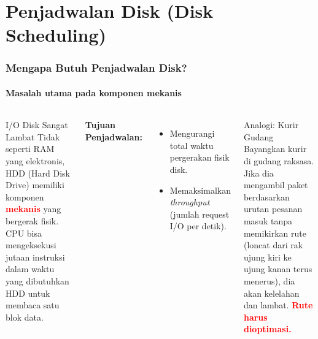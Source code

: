 \documentclass[t,aspectratio=169,xcolor=dvipsnames]{beamer}
\newcommand{\tem}[1]{\textbf{\textcolor{red}{#1}}}
\begin{document}
\section{Penjadwalan Disk (Disk Scheduling)}

\begin{frame}[shrink=5]
    \frametitle{Mengapa Butuh Penjadwalan Disk?}
    \framesubtitle{Masalah utama pada komponen mekanis}
    \small
    \begin{columns}[T]
        \begin{block}{I/O Disk Sangat Lambat}
            Tidak seperti RAM yang elektronis, HDD (Hard Disk Drive) memiliki komponen \tem{mekanis} yang bergerak fisik. CPU bisa mengeksekusi jutaan instruksi dalam waktu yang dibutuhkan HDD untuk membaca satu blok data.
        \end{block}
        \textbf{Tujuan Penjadwalan:}
        \begin{itemize}
            \item Mengurangi total waktu pergerakan fisik disk.
            \item Memaksimalkan \textit{throughput} (jumlah request I/O per detik).
        \end{itemize}

        \begin{exampleblock}{Analogi: Kurir Gudang}
            Bayangkan kurir di gudang raksasa. Jika dia mengambil paket berdasarkan urutan pesanan masuk tanpa memikirkan rute (loncat dari rak ujung kiri ke ujung kanan terus menerus), dia akan kelelahan dan lambat. \tem{Rute harus dioptimasi.}
        \end{exampleblock}
    \end{columns}
\end{frame}
\end{document}
